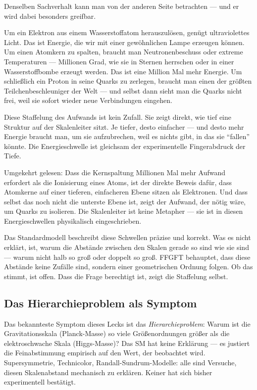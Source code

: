 Denselben Sachverhalt kann man von der anderen Seite betrachten ---
und er wird dabei besonders greifbar.

Um ein Elektron aus einem Wasserstoffatom herauszulösen, genügt
ultraviolettes Licht. Das ist Energie, die wir mit einer gewöhnlichen
Lampe erzeugen können. Um einen Atomkern zu spalten, braucht man
Neutronenbeschuss oder extreme Temperaturen --- Millionen Grad, wie sie
in Sternen herrschen oder in einer Wasserstoffbombe erzeugt werden.
Das ist eine Million Mal mehr Energie. Um schließlich ein Proton in
seine Quarks zu zerlegen, braucht man einen der größten
Teilchenbeschleuniger der Welt --- und selbst dann sieht man die
Quarks nicht frei, weil sie sofort wieder neue Verbindungen eingehen.

Diese Staffelung des Aufwands ist kein Zufall. Sie zeigt direkt, wie
tief eine Struktur auf der Skalenleiter sitzt. Je tiefer, desto
einfacher --- und desto mehr Energie braucht man, um sie aufzubrechen,
weil es nichts gibt, in das sie ``fallen'' könnte. Die Energieschwelle
ist gleichsam der experimentelle Fingerabdruck der Tiefe.

Umgekehrt gelesen: Dass die Kernspaltung Millionen Mal mehr Aufwand
erfordert als die Ionisierung eines Atoms, ist der direkte Beweis
dafür, dass Atomkerne auf einer tieferen, einfacheren Ebene sitzen als
Elektronen. Und dass selbst das noch nicht die unterste Ebene ist,
zeigt der Aufwand, der nötig wäre, um Quarks zu isolieren. Die
Skalenleiter ist keine Metapher --- sie ist in diesen Energieschwellen
physikalisch eingeschrieben.

Das Standardmodell beschreibt diese Schwellen präzise und korrekt.
Was es nicht erklärt, ist, warum die Abstände zwischen den Skalen
gerade so sind wie sie sind --- warum nicht halb so groß oder doppelt
so groß. FFGFT behauptet, dass diese Abstände keine Zufälle sind,
sondern einer geometrischen Ordnung folgen. Ob das stimmt, ist offen.
Dass die Frage berechtigt ist, zeigt die Staffelung selbst.

\subsection*{Das Hierarchieproblem als Symptom}

Das bekannteste Symptom dieses Lecks ist das \emph{Hierarchieproblem}:
Warum ist die Gravitationsskala (Planck-Masse) so viele
Größenordnungen größer als die elektroschwache Skala (Higgs-Masse)?
Das SM hat keine Erklärung --- es justiert die Feinabstimmung empirisch
auf den Wert, der beobachtet wird. Supersymmetrie, Technicolor,
Randall-Sundrum-Modelle: alle sind Versuche, diesen Skalenabstand
mechanisch zu erklären. Keiner hat sich bisher experimentell bestätigt.

